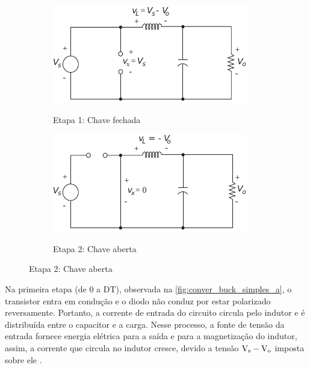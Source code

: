             \begin{figure}[H]
                \centering
                \caption{Etapas de funcionamento do conversor estático do tipo Buck}
                \begin{subfigure}[H]{.49\textwidth}
                    \centering
                    \caption{Etapa 1: Chave fechada}
                    \includegraphics[scale=1.4]{pdf/outros/conversor_buck_desc_a.pdf}
                    \label{fig:conver_buck_simples_a}
                \end{subfigure}
                \begin{subfigure}[H]{.49\textwidth}
                    \centering
                    \caption{Etapa 2: Chave aberta}
                    \includegraphics[scale=1.4]{pdf/outros/conversor_buck_desc_b.pdf}
                    \label{fig:conver_buck_simples_b}
                \end{subfigure}
            	\label{fig:conver_buck_simples_ab}
            \end{figure}
            
            Na primeira etapa (de 0 a DT), observada na \autoref{fig:conver_buck_simples_a}, o transistor entra em condução e o diodo não conduz por estar polarizado reversamente. Portanto, a corrente de entrada do circuito circula pelo indutor e é distribuída entre o capacitor e a carga. Nesse processo, a fonte de tensão da entrada fornece energia elétrica para a saída e para a magnetização do indutor, assim, a corrente que circula no indutor cresce, devido a tensão $\text{V}_\text{s} - \text{V}_\text{o}$ imposta sobre ele \cite{ref:ELP_livro_Hart}.
            
